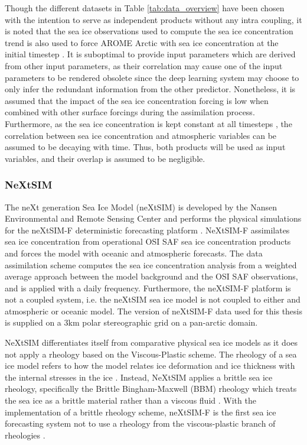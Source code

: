 \documentclass[../main/thesis.tex]{subfiles}
\begin{document}
Though the different datasets in Table \ref{tab:data_overview} have been chosen with the intention to serve as independent products without any intra coupling, it is noted that the sea ice observations used to compute the sea ice concentration trend \citep{Tonboe2017} is also used to force AROME Arctic with sea ice concentration at the initial timestep \citep{Mueller2017}. It is suboptimal to provide input parameters which are derived from other input parameters, as their correlation may cause one of the input parameters to be rendered obsolete since the deep learning system may choose to only infer the redundant information from the other predictor. Nonetheless, it is assumed that the impact of the sea ice concentration forcing is low when combined with other surface forcings during the assimilation process. Furthermore, as the sea ice concentration is kept constant at all timesteps \citep{Mueller2017}, the correlation between sea ice concentration and atmospheric variables can be assumed to be decaying with time. Thus, both products will be used as input variables, and their overlap is assumed to be negligible.


\subsubsection{NeXtSIM}
\label{sec:nextsim}
The neXt generation Sea Ice Model (neXtSIM) is developed by the Nansen Environmental and Remote Sensing Center and performs the physical simulations for the neXtSIM-F deterministic forecasting platform \citep{Williams2021}. NeXtSIM-F assimilates sea ice concentration from operational OSI SAF sea ice concentration products \citep{Tonboe2017, Lavelle2016} and forces the model with oceanic and atmospheric forecasts. The data assimilation scheme computes the sea ice concentration analysis from a weighted average approach between the model background and the OSI SAF observations, and is applied with a daily frequency. Furthermore, the neXtSIM-F platform is not a coupled system, i.e. the neXtSIM sea ice model is not coupled to either and atmospheric or oceanic model. The version of neXtSIM-F data used for this thesis is supplied on a 3km polar stereographic grid on a pan-arctic domain. 

NeXtSIM differentiates itself from comparative physical sea ice models as it does not apply a rheology based on the Viscous-Plastic scheme. The rheology of a sea ice model refers to how the model relates ice deformation and ice thickness with the internal stresses in the ice \citep{Hibler1979}. Instead, NeXtSIM applies a brittle sea ice rheology, specifically the Brittle Bingham-Maxwell (BBM) rheology which treats the sea ice as a brittle material rather than a viscous fluid \citep{Olason2022}. With the implementation of a brittle rheology scheme, neXtSIM-F is the first sea ice forecasting system not to use a rheology from the viscous-plastic branch of rheologies \citep{Williams2021}.
\end{document}
